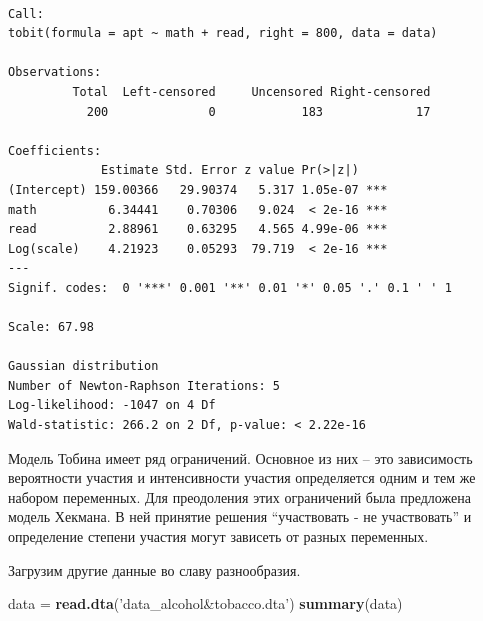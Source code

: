 \documentclass[]{book}
\newenvironment{Shaded}{\begin{snugshade}}{\end{snugshade}}
\newcommand{\KeywordTok}[1]{\textcolor[rgb]{0.13,0.29,0.53}{\textbf{#1}}}
\newcommand{\NormalTok}[1]{#1}
\newcommand{\StringTok}[1]{\textcolor[rgb]{0.31,0.60,0.02}{#1}}
\begin{document}
\begin{verbatim}

Call:
tobit(formula = apt ~ math + read, right = 800, data = data)

Observations:
         Total  Left-censored     Uncensored Right-censored 
           200              0            183             17 

Coefficients:
             Estimate Std. Error z value Pr(>|z|)    
(Intercept) 159.00366   29.90374   5.317 1.05e-07 ***
math          6.34441    0.70306   9.024  < 2e-16 ***
read          2.88961    0.63295   4.565 4.99e-06 ***
Log(scale)    4.21923    0.05293  79.719  < 2e-16 ***
---
Signif. codes:  0 '***' 0.001 '**' 0.01 '*' 0.05 '.' 0.1 ' ' 1

Scale: 67.98 

Gaussian distribution
Number of Newton-Raphson Iterations: 5 
Log-likelihood: -1047 on 4 Df
Wald-statistic: 266.2 on 2 Df, p-value: < 2.22e-16 
\end{verbatim}

Модель Тобина имеет ряд ограничений. Основное из них -- это зависимость вероятности участия и интенсивности участия определяется одним и тем же набором переменных. Для преодоления этих ограничений была предложена модель Хекмана. В ней принятие решения ``участвовать - не участвовать'' и определение степени участия могут зависеть от разных переменных.

Загрузим другие данные во славу разнообразия.

\begin{Shaded}
\begin{Highlighting}[]
\NormalTok{data =}\StringTok{ }\KeywordTok{read.dta}\NormalTok{(}\StringTok{'data_alcohol&tobacco.dta'}\NormalTok{)}
\KeywordTok{summary}\NormalTok{(data)}
\end{Highlighting}
\end{Shaded}
\end{document}
